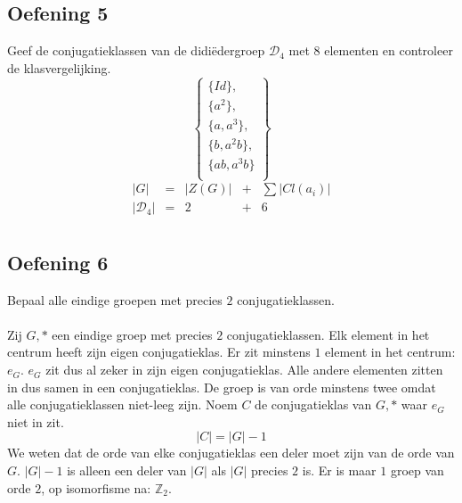 \documentclass[main.tex]{subfiles}
\begin{document}
\subsection*{Oefening 5}
\label{sec:oz3-oef4}
Geef de conjugatieklassen van de didi\"edergroep $\mathcal{D}_{4}$ met $8$ elementen en controleer de klasvergelijking.
\[ 
\left\{ 
  \begin{array}{c}
\{ Id \},\\
\{ a^{2} \},\\
\{ a,a^{3} \},\\
\{ b,a^{2}b \},\\
\{ ab,a^{3}b \}\\
\end{array}
\right\}
\]
\[
\begin{array}{ccccc}
  |G| &=& |Z(G)| &+& \sum|Cl(a_{i})|\\
  |\mathcal{D}_{4}| &=& 2 &+& 6\\
\end{array}
\]

\subsection*{Oefening 6}
\label{sec:oz3-oef5}
Bepaal alle eindige groepen met precies $2$ conjugatieklassen.\\\\
Zij $G,*$ een eindige groep met precies $2$ conjugatieklassen.
Elk element in het centrum heeft zijn eigen conjugatieklas.
Er zit minstens $1$ element in het centrum: $e_{G}$.
$e_{G}$ zit dus al zeker in zijn eigen conjugatieklas.
Alle andere elementen zitten in dus samen in een conjugatieklas.
De groep is van orde minstens twee omdat alle conjugatieklassen niet-leeg zijn.
Noem $C$ de conjugatieklas van $G,*$ waar $e_{G}$ niet in zit.
\[ |C| = |G| - 1 \]
We weten dat de orde van elke conjugatieklas een deler moet zijn van de orde van $G$.
$|G| - 1$ is alleen een deler van $|G|$ als $|G|$ precies $2$ is.
Er is maar $1$ groep van orde $2$, op isomorfisme na: $\mathbb{Z}_{2}$.
\end{document}
